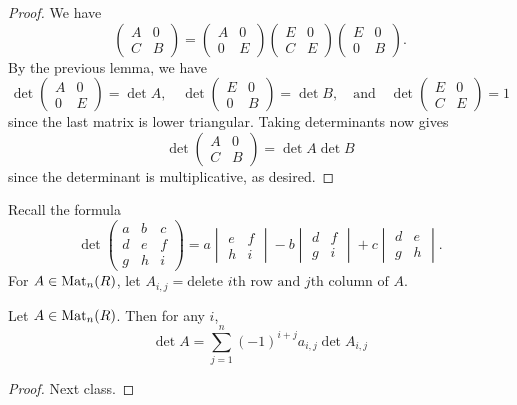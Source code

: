 \begin{proof}
  We have
  \[
    \begin{pmatrix}
      A & 0 \\
      C & B
    \end{pmatrix}
    =
    \begin{pmatrix}
      A & 0  \\
      0 & E
    \end{pmatrix}
    \begin{pmatrix}
      E & 0  \\
      C & E
    \end{pmatrix}
    \begin{pmatrix}
      E & 0  \\
      0 & B
    \end{pmatrix}.
  \]
  By the previous lemma, we have
  \[
    \det
    \begin{pmatrix}
      A & 0 \\
      0 & E
    \end{pmatrix} = \det A,
    \quad
    \det
    \begin{pmatrix}
      E & 0 \\
      0 & B
    \end{pmatrix} = \det B,
    \quad \text{and} \quad
    \det
    \begin{pmatrix}
      E & 0 \\
      C & E
    \end{pmatrix} = 1
  \]
  since the last matrix is lower triangular. Taking
  determinants now gives
  \[
    \det
    \begin{pmatrix}
      A & 0 \\
      C & B
    \end{pmatrix}
    = \det A \det B
  \]
  since the determinant is multiplicative, as desired.
\end{proof}

\begin{remark}
  Recall the formula
  \[
    \det
    \begin{pmatrix}
      a & b & c \\
      d & e & f \\
      g & h & i
    \end{pmatrix}
    = a
    \begin{vmatrix}
      e & f \\
      h & i
    \end{vmatrix}
    - b
    \begin{vmatrix}
      d & f \\
      g & i
    \end{vmatrix}
    + c
    \begin{vmatrix}
      d & e \\
      g & h
    \end{vmatrix}.
  \]
  For $A \in \operatorname{Mat}_n(R)$, let
  $A_{i, j} = \text{delete $i$th row and $j$th column of $A$}$.
\end{remark}

\begin{prop}
  Let $A \in \operatorname{Mat}_n(R)$. Then for any $i$,
  \[
    \det A = \sum_{j = 1}^n (-1)^{i + j} a_{i, j} \det A_{i, j}
  \]
\end{prop}

\begin{proof}
  Next class.
\end{proof}
